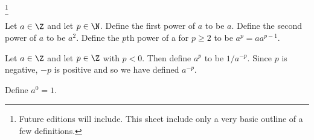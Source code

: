 
\footnote{Future editions will include. This sheet include only a very basic outline of a few definitions.}


Let $a \in \Z$ and let $p \in \N$.
Define the first power of $a$ to be $a$.
Define the second power of $a$ to be $a^2$.
Define the $p$th power of a for $p \geq 2$ to be $a^p = aa^{p-1}$.


Let $a \in \Z$ and let $p \in \Z$ with $p < 0$.
Then define $a^{p}$ to be $1/a^{-p}$.
Since $p$ is negative, $-p$ is positive and so we have defined $a^{-p}$.


Define $a^0 = 1$.

\blankpage

